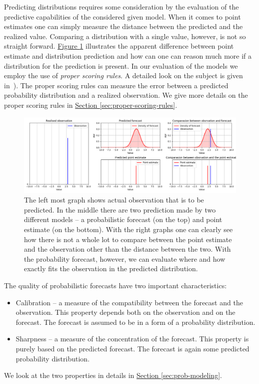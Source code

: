 \documentclass[12pt,a4paper,twoside]{scrartcl}
\numberwithin{equation}{section}
\newcommand{\reffig}[1]{\hyperref[#1]{Figure \ref*{#1}}}
\newcommand{\refsec}[1]{\hyperref[#1]{Section \ref*{#1}}}
\begin{document}
Predicting distributions requires some consideration by the evaluation of the predictive capabilities of the considered given model. When it comes to point estimates one can simply measure the distance between the predicted and the realized value. Comparing a distribution with a single value, however, is not so straight forward. \reffig{fig:point-vs-dist} illustrates the apparent difference between point estimate and distribution prediction and how can one can reason much more if a distribution for the prediction is present. In our evaluation of the models we employ the use of \emph{proper scoring rules}. A detailed look on the subject is given in~\cite{rafteryg2007}). The proper scoring rules can measure the error between a predicted probability distribution and a realized observation. We give more details on the proper scoring rules in \refsec{sec:proper-scoring-rules}.
\begin{center}
  \begin{figure}[H]
    \centering
    \includegraphics[height=0.5\textwidth, width=1.0\textwidth]{figures/distribution_point.png}
    \caption[Point estimate and distribution forecast]{The left most graph shows actual observation that is to be predicted. In the middle there are two prediction made by two different models -- a probabilistic forecast (on the top) and point estimate (on the bottom). With the right graphs one can clearly see how there is not a whole lot to compare between the point estimate and the observation other than the distance between the two. With the probability forecast, however, we can evaluate where and how exactly fits the observation in the predicted distribution.}\label{fig:point-vs-dist}
  \end{figure}
\end{center}

The quality of probabilistic forecasts have two important characteristics:
\begin{itemize}
\item Calibration -- a measure of the compatibility between the forecast and the observation. This property depends both on the observation and on the forecast. The forecast is assumed to be in a form of a probability distribution.
\item Sharpness -- a measure of the concentration of the forecast. This property is purely based on the predicted forecast. The forecast is again some predicted probability distribution.
\end{itemize}
We look at the two properties in details in \refsec{sec:prob-modeling}.
\end{document}
